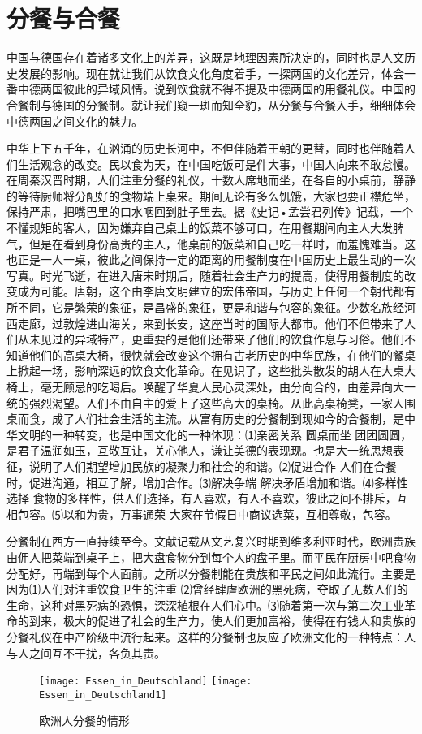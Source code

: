 \section{分餐与合餐}
\par
中国与德国存在着诸多文化上的差异，这既是地理因素所决定的，同时也是人文历史发展的影响。现在就让我们从饮食文化角度着手，一探两国的文化差异，体会一番中德两国彼此的异域风情。说到饮食就不得不提及中德两国的用餐礼仪。中国的合餐制与德国的分餐制。就让我们窥一斑而知全豹，从分餐与合餐入手，细细体会中德两国之间文化的魅力。
\par
中华上下五千年，在汹涌的历史长河中，不但伴随着王朝的更替，同时也伴随着人们生活观念的改变。民以食为天，在中国吃饭可是件大事，中国人向来不敢怠慢。在周秦汉晋时期，人们注重分餐的礼仪，十数人席地而坐，在各自的小桌前，静静的等待厨师将分配好的食物端上桌来。期间无论有多么饥饿，大家也要正襟危坐，保持严肃，把嘴巴里的口水咽回到肚子里去。据《史记•孟尝君列传》记载，一个不懂规矩的客人，因为嫌弃自己桌上的饭菜不够可口，在用餐期间向主人大发脾气，但是在看到身份高贵的主人，他桌前的饭菜和自己吃一样时，而羞愧难当。这也正是一人一桌，彼此之间保持一定的距离的用餐制度在中国历史上最生动的一次写真。时光飞逝，在进入唐宋时期后，随着社会生产力的提高，使得用餐制度的改变成为可能。唐朝，这个由李唐文明建立的宏伟帝国，与历史上任何一个朝代都有所不同，它是繁荣的象征，是昌盛的象征，更是和谐与包容的象征。少数名族经河西走廊，过敦煌进山海关，来到长安，这座当时的国际大都市。他们不但带来了人们从未见过的异域特产，更重要的是他们还带来了他们的饮食作息与习俗。他们不知道他们的高桌大椅，很快就会改变这个拥有古老历史的中华民族，在他们的餐桌上掀起一场，影响深远的饮食文化革命。在见识了，这些批头散发的胡人在大桌大椅上，毫无顾忌的吃喝后。唤醒了华夏人民心灵深处，由分向合的，由差异向大一统的强烈渴望。人们不由自主的爱上了这些高大的桌椅。从此高桌椅凳，一家人围桌而食，成了人们社会生活的主流。从富有历史的分餐制到现如今的合餐制，是中华文明的一种转变，也是中国文化的一种体现：⑴亲密关系  圆桌而坐 团团圆圆，是君子温润如玉，互敬互让，关心他人，谦让美德的表现现。也是大一统思想表征，说明了人们期望增加民族的凝聚力和社会的和谐。⑵促进合作  人们在合餐时，促进沟通，相互了解，增加合作。⑶解决争端  解决矛盾增加和谐。⑷多样性选择  食物的多样性，供人们选择，有人喜欢，有人不喜欢，彼此之间不排斥，互相包容。⑸以和为贵，万事通荣 大家在节假日中商议选菜，互相尊敬，包容。
\par
分餐制在西方一直持续至今。文献记载从文艺复兴时期到维多利亚时代，欧洲贵族由佣人把菜端到桌子上，把大盘食物分到每个人的盘子里。而平民在厨房中吧食物分配好，再端到每个人面前。之所以分餐制能在贵族和平民之间如此流行。主要是因为⑴人们对注重饮食卫生的注重 ⑵曾经肆虐欧洲的黑死病，夺取了无数人们的生命，这种对黑死病的恐惧，深深植根在人们心中。⑶随着第一次与第二次工业革命的到来，极大的促进了社会的生产力，使人们更加富裕，使得在有钱人和贵族的分餐礼仪在中产阶级中流行起来。这样的分餐制也反应了欧洲文化的一种特点：人与人之间互不干扰，各负其责。
\begin{figure}
\centering
\texttt{[image: Essen\_in\_Deutschland]}
\texttt{[image: Essen\_in\_Deutschland1]}
\caption{欧洲人分餐的情形}
\end{figure}


